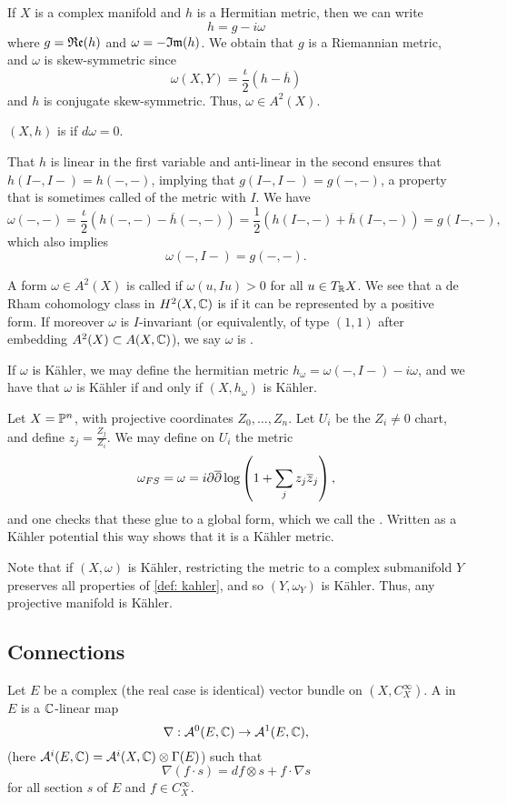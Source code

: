 If $X$ is a complex manifold and $h$ is a  Hermitian metric, then we can write
\[
h=g-i\omega
\]
where $g=\mathfrak{R}\mathfrak{e}(h)$ and $\omega=-\mathfrak{I}\mathfrak{m}(h)$. We obtain that $g$ is a Riemannian metric, and $\omega$ is skew-symmetric since
\[
\omega(X,Y)=\frac{\iota}{2}(h-\overline h)
\]
and $h$ is conjugate skew-symmetric. Thus, $\omega\in A^2(X)$.
\begin{definition}
	$(X,h)$ is  if $d\omega=0$.
\end{definition}
That $h$ is linear in the first variable and anti-linear in the second ensures that $h(I-,I-)=h(-,-)$, implying that $g(I-,I-)=g(-,-)$, a property that is sometimes called  of the metric with $I$. We have 
\[
\omega(-,-)=\frac{\iota}{2}(h(-,-)-\overline h(-,-))=\frac{1}{2}(h(I-,-)+\overline h (I-,-))=g(I-,-),
\]
which also implies
\[
\omega(-,I-)=g(-,-).
\]
\begin{definition}\label{def: kahler}
	A form $\omega\in A^2(X)$ is called  if $\omega(u,Iu)>0$ for all $u\in T_\mathbb R X$. We see that a de Rham cohomology class in $H^2(X,\mathbb C)$ is  if it can be represented by a positive form. If moreover $\omega$ is $I$-invariant (or equivalently, of type $(1,1)$ after embedding $A^2(X)\subset A(X,\mathbb C)$), we say $\omega$ is .
\end{definition}
If $\omega$ is Kähler, we may define the hermitian metric $h_\omega=\omega(-,I-)-i\omega$, and we have that $\omega$ is Kähler if and only if $(X,h_\omega)$ is Kähler.
\begin{example}
	Let $X=\mathbb{P}^n$, with projective coordinates $Z_0,\dots,Z_n$. Let $U_i$ be the $Z_i\neq 0$ chart, and define $z_j=\frac{Z_j}{Z_i}$. We may define on $U_i$ the metric
	\[
	\omega_{FS}=\omega=i\partial\overline\partial\log\left(1+\sum_jz_j\overline z_j\right),
	\]
	and one checks that these glue to a global form, which we call the . Written as a Kähler potential this way shows that it is a Kähler metric.
\end{example}
Note that if $(X,\omega)$ is Kähler, restricting the metric to a complex submanifold $Y$ preserves all properties of \autoref{def: kahler}, and so $(Y,\omega_Y)$ is Kähler. Thus, any projective manifold is Kähler.

\subsection{Connections}

Let $E$ be a complex (the real case is identical) vector bundle on $(X,C_X^\infty)$. A  in $E$ is a $\mathbb C$-linear map 
\[
\nabla:\mathcal{A}^0(E,\mathbb C)\to \mathcal{A}^1(E,\mathbb C),
\]
(here $\mathcal{A}^i(E,\mathbb C)= \mathcal{A}^i(X,\mathbb C)\otimes \Gamma(E)$) such that
%
\[
\nabla(f\cdot s)=df\otimes s+f\cdot\nabla s
\]
for all section $s$ of $E$ and $f\in C^\infty_X$.

